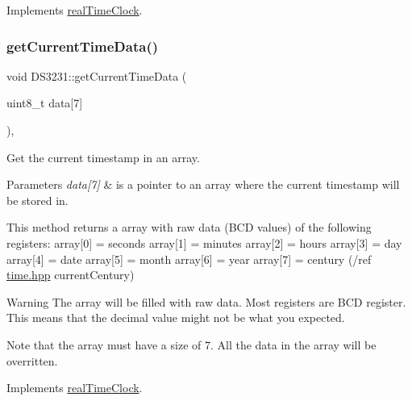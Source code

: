 Implements \mbox{\hyperlink{classreal_time_clock_a8fe956100fc4e339cd68ab413465f666}{real\+Time\+Clock}}.

\mbox{\label{class_d_s3231_a0ca41c2242367c5ff1424d1b12f909c5}} 
\subsubsection{\texorpdfstring{get\+Current\+Time\+Data()}{getCurrentTimeData()}}
{\footnotesize\ttfamily void D\+S3231\+::get\+Current\+Time\+Data (\begin{DoxyParamCaption}\item[{uint8\+\_\+t}]{data\mbox{[}7\mbox{]} }\end{DoxyParamCaption})\hspace{0.3cm}{\ttfamily [override]}, {\ttfamily [virtual]}}



Get the current timestamp in an array. 


\begin{DoxyParams}{Parameters}
{\em data\mbox{[}7\mbox{]}} & is a pointer to an array where the current timestamp will be stored in.\\
\hline
\end{DoxyParams}
This method returns a array with raw data (B\+CD values) of the following registers\+: array\mbox{[}0\mbox{]} = seconds array\mbox{[}1\mbox{]} = minutes array\mbox{[}2\mbox{]} = hours array\mbox{[}3\mbox{]} = day array\mbox{[}4\mbox{]} = date array\mbox{[}5\mbox{]} = month array\mbox{[}6\mbox{]} = year array\mbox{[}7\mbox{]} = century (/ref \mbox{\hyperlink{time_8hpp_source}{time.\+hpp}} current\+Century) \begin{DoxyWarning}{Warning}
The array will be filled with raw data. Most registers are B\+CD register. This means that the decimal value might not be what you expected. 

Note that the array must have a size of 7. All the data in the array will be overritten. 
\end{DoxyWarning}


Implements \mbox{\hyperlink{classreal_time_clock_a2d1613b3cd572f62bc9faaea6a0f82f2}{real\+Time\+Clock}}.

\mbox{\label{class_d_s3231_a04e087a918d2d48b0cdd2e3c6c2f595f}} 
